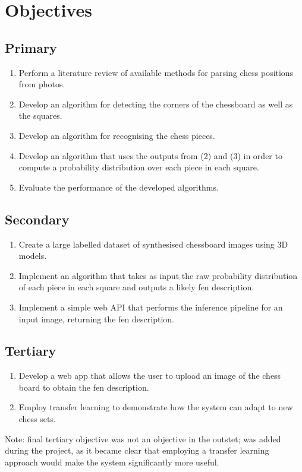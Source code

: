 \section{Objectives}
\subsection{Primary}
\begin{enumerate}
    \item Perform a literature review of available methods for parsing chess positions from photos.
    \item Develop an algorithm for detecting the corners of the chessboard as well as the squares.
    \item Develop an algorithm for recognising the chess pieces.
    \item Develop an algorithm that uses the outputs from (2) and (3) in order to compute a probability distribution over each piece in each square.
    \item Evaluate the performance of the developed algorithms.
\end{enumerate}
    

\subsection{Secondary}
\begin{enumerate}
    \item Create a large labelled dataset of synthesised chessboard images using 3D models.
    \item Implement an algorithm that takes as input the raw probability distribution of each piece in each square and outputs a likely \gls{fen} description.
    \item Implement a simple web API that performs the inference pipeline for an input image, returning the \gls{fen} description. 
\end{enumerate}
\subsection{Tertiary}
\begin{enumerate}
    \item Develop a web app that allows the user to upload an image of the chess board to obtain the \gls{fen} description.
    \item Employ transfer learning to demonstrate how the system can adapt to new chess sets.
\end{enumerate}

Note: final tertiary objective was not an objective in the outstet; was added during the project, as it became clear that employing a transfer learning approach would make the system significantly more useful.
